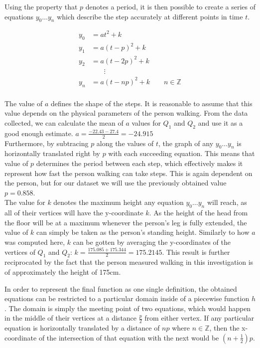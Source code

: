 \documentclass[12pt, a4paper]{article}
\begin{document}
Using the property that $p$ denotes a period, it is then possible to create a
series of equations $y_0 \dots y_n$ which describe the step accurately at different points in
time $t$.

\begin{align*}
    y_0 & = at^2 + k                                \\
    y_1 & = a(t-p)^2 + k                            \\
    y_2 & = a(t-2p)^2 + k                           \\
        & \phantom{t=\,} \vdots                     \\
    y_n & = a(t-np)^2 + k \qquad n \in \mathbb{Z} \\
\end{align*}

The value of $a$ defines the shape of the steps. It is reasonable to assume that
this value depends on the physical parameters of the person walking. From the
data collected, we can calculate the mean of $a$ values for $Q_1$ and $Q_2$ and
use it as a good enough estimate. $a = \frac{-22.43 -27.4}{2} = -24.915$ \\

Furthermore, by subtracing $p$ along the values of $t$, the graph of any $y_0
    \dots y_n$ is horizontally translated right by $p$ with each succeeding
equation. This means that value of $p$ determines the period between each step,
which effectively makes it represent how fast the person walking can take steps.
This is again dependent on the person, but for our dataset we will use the
previously obtained value $p=0.858$. \\

The value for $k$ denotes the maximum height any equation $y_0 \dots y_n$ will
reach, as all of their vertices will have the y-coordinate $k$. As the height of
the head from the floor will be at a maximum whenever the person's leg is fully
extended, the value of $k$ can simply be taken as the person's standing height.
Similarly to how $a$ was computed here, $k$ can be gotten by averaging the
y-coordinates of the vertices of $Q_1$ and $Q_2$: $k = \frac{175.085 +
        175.344}{2} = 175.2145$. This result is further reciprocated by the fact that
the person measured walking in this investigation is of approximately the height
of 175cm.

In order to represent the final function as one single definition, the obtained
equations can be restricted to a particular domain inside of a piecewise
function $h$. The domain is simply the meeting point of two equations, which
would happen in the middle of their vertices at a distance $\frac{p}{2}$ from
either vertex. If any particular equation is horizontally translated by a
distance of $np$ where $n \in \mathbb{Z}$, then the x-coordinate of the
intersection of that equation with the next would be $(n+\frac{1}{2})p$. \\
\end{document}
